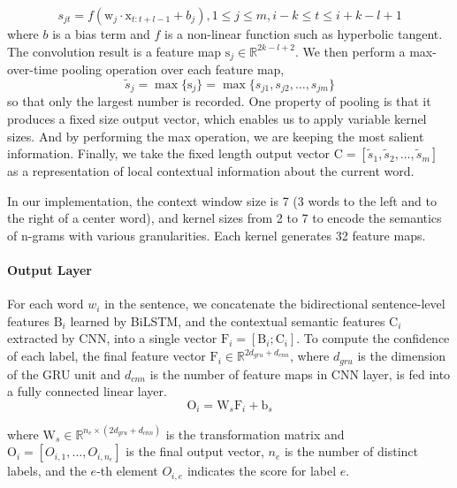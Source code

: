 \begin{equation} s_{jt}=f(\text{w}_j \cdot \text{x}_{t:t+l-1} + b_j), 1 \leq j \leq m, i-k \leq t \leq i+k-l+1 \end{equation}
where $b$ is a bias term and $f$ is a non-linear function such as hyperbolic tangent. The convolution result is a feature map $\text{s}_j \in \mathbb{R}^{2k-l+2}$.
We then perform a max-over-time pooling operation \cite{collobert2011natural} over each feature map,
\begin{equation}
\tilde{s}_j=\max\{\text{s}_j\}=\max\{s_{j1}, s_{j2}, \ldots, s_{jm}\}	
\end{equation}
so that only the largest number is recorded. One property of pooling is that it produces a fixed size output vector, which enables us to apply variable kernel sizes. And by performing the max operation, we are keeping the most salient information. Finally, we take the fixed length output vector $\text{C}=[\tilde{s}_1, \tilde{s}_2, \ldots, \tilde{s}_m]$ as a representation of local contextual information about the current word.

In our implementation, the context window size is 7 (3 words to the left and to the right of a center word), and kernel sizes from 2 to 7 to encode the semantics of n-grams with various granularities. Each kernel generates 32 feature maps.

\paragraph{Output Layer\label{output}}
For each word $w_i$ in the sentence, we concatenate the bidirectional sentence-level features $\text{B}_i$ learned by BiLSTM, and the contextual semantic features $\text{C}_i$ extracted by CNN, into a single vector $\text{F}_i=[\text{B}_i;\text{C}_i]$. To compute the confidence of each label, the final feature vector $\text{F}_i \in \mathbb{R}^{2d_{gru}+d_{cnn}}$, where $d_{gru}$ is the dimension of the GRU unit and $d_{cnn}$ is the number of feature maps in CNN layer, is fed into a fully connected linear layer.
\begin{equation}
	 \text{O}_i = \text{W}_s\text{F}_i+\text{b}_s
\end{equation}

where $\text{W}_s \in \mathbb{R}^{n_{e} \times (2d_{gru} + d_{cnn})}$ is the transformation matrix and $\text{O}_i=[O_{i,1}, \ldots, O_{i,{n_e}}]$ is the final output vector, $n_{e}$ is the number of distinct labels, and the $e$-th element $O_{i, e}$ indicates the score for label $e$.

